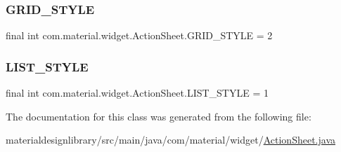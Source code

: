 \subsubsection{\texorpdfstring{G\+R\+I\+D\+\_\+\+S\+T\+Y\+LE}{GRID\_STYLE}}
{\footnotesize\ttfamily final int com.\+material.\+widget.\+Action\+Sheet.\+G\+R\+I\+D\+\_\+\+S\+T\+Y\+LE = 2\hspace{0.3cm}{\ttfamily [static]}}

\mbox{\label{classcom_1_1material_1_1widget_1_1_action_sheet_ac49e86ce59a329ae7361381e3fc8cdfc}} 
\subsubsection{\texorpdfstring{L\+I\+S\+T\+\_\+\+S\+T\+Y\+LE}{LIST\_STYLE}}
{\footnotesize\ttfamily final int com.\+material.\+widget.\+Action\+Sheet.\+L\+I\+S\+T\+\_\+\+S\+T\+Y\+LE = 1\hspace{0.3cm}{\ttfamily [static]}}



The documentation for this class was generated from the following file\+:\begin{DoxyCompactItemize}
\item 
materialdesignlibrary/src/main/java/com/material/widget/\hyperlink{_action_sheet_8java}{Action\+Sheet.\+java}\end{DoxyCompactItemize}
